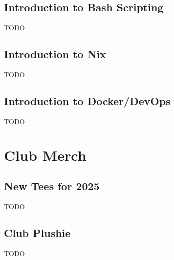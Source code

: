 \documentclass[11pt,fleqn]{article}
\begin{document}
\subsection{Introduction to Bash Scripting}

TODO

\subsection{Introduction to Nix}

TODO

\subsection{Introduction to Docker/DevOps}

TODO

\newpage

\section{Club Merch}

\subsection{New Tees for 2025}

TODO

\subsection{Club Plushie}

TODO
\end{document}
